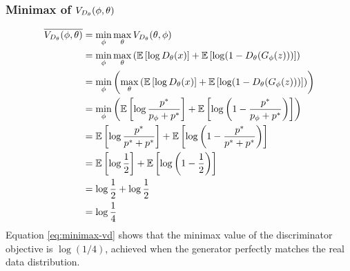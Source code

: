 \subsubsection{Minimax of $V_{D_\theta}(\phi, \theta)$}
\label{sec:minimax-vd}
\begin{align}
	\overline{V_{D_\theta}(\phi, \theta)} & = \min_{\phi}\max_{\theta} V_{D_\theta}(\theta, \phi) \nonumber                                                                                                 \\
	               & = \min_{\phi}\max_{\theta} \left( \mathbb{E}\left[\log{D_\theta(x)}\right] + \mathbb{E}\left[\log(1 - D_\theta(G_\phi(z)))\right] \right) \nonumber                       \\
	               & = \min_{\phi}\left(\max_{\theta} \left( \mathbb{E}\left[\log{D_\theta(x)}\right] + \mathbb{E}\left[\log(1 - D_\theta(G_\phi(z)))\right] \right) \right) \nonumber         \\
	               & = \min_{\phi}\left(\mathbb{E}\left[\log\frac{p^*}{p_{\phi} + p^*}\right] + \mathbb{E}\left[\log\left(1 - \frac{p^*}{p_{\phi} + p^*}\right)\right] \right) \nonumber \\
	               & = \mathbb{E}\left[\log\frac{p^*}{p^* + p^*}\right] + \mathbb{E}\left[\log\left(1 - \frac{p^*}{p^* + p^*}\right)\right] \nonumber                          \\
	               & = \mathbb{E}\left[\log\frac{1}{2}\right] + \mathbb{E}\left[\log{\left(1 - \frac{1}{2}\right)}\right] \nonumber                                            \\
	               & = \log\frac{1}{2} + \log\frac{1}{2} \nonumber                                                                                                             \\
	               & = \log\frac{1}{4} \label{eq:minimax-vd}
\end{align}
Equation \ref{eq:minimax-vd} shows that the minimax value of the discriminator
objective is $\log(1/4)$, achieved when the generator perfectly matches the
real data distribution.
